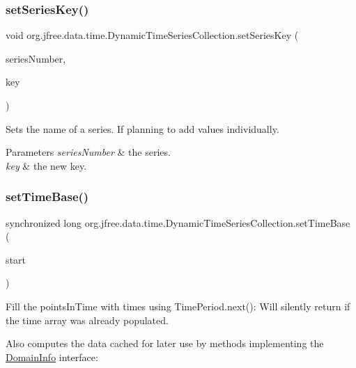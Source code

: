 \subsubsection{\texorpdfstring{set\+Series\+Key()}{setSeriesKey()}}
{\footnotesize\ttfamily void org.\+jfree.\+data.\+time.\+Dynamic\+Time\+Series\+Collection.\+set\+Series\+Key (\begin{DoxyParamCaption}\item[{int}]{series\+Number,  }\item[{Comparable}]{key }\end{DoxyParamCaption})}

Sets the name of a series. If planning to add values individually.


\begin{DoxyParams}{Parameters}
{\em series\+Number} & the series. \\
\hline
{\em key} & the new key. \\
\hline
\end{DoxyParams}
\mbox{\label{classorg_1_1jfree_1_1data_1_1time_1_1_dynamic_time_series_collection_a3f573d0dbae30daea40d586a5f80d367}} 
\subsubsection{\texorpdfstring{set\+Time\+Base()}{setTimeBase()}}
{\footnotesize\ttfamily synchronized long org.\+jfree.\+data.\+time.\+Dynamic\+Time\+Series\+Collection.\+set\+Time\+Base (\begin{DoxyParamCaption}\item[{\mbox{\hyperlink{classorg_1_1jfree_1_1data_1_1time_1_1_regular_time_period}{Regular\+Time\+Period}}}]{start }\end{DoxyParamCaption})}

Fill the points\+In\+Time with times using Time\+Period.\+next()\+: Will silently return if the time array was already populated.

Also computes the data cached for later use by methods implementing the \mbox{\hyperlink{interfaceorg_1_1jfree_1_1data_1_1_domain_info}{Domain\+Info}} interface\+:


